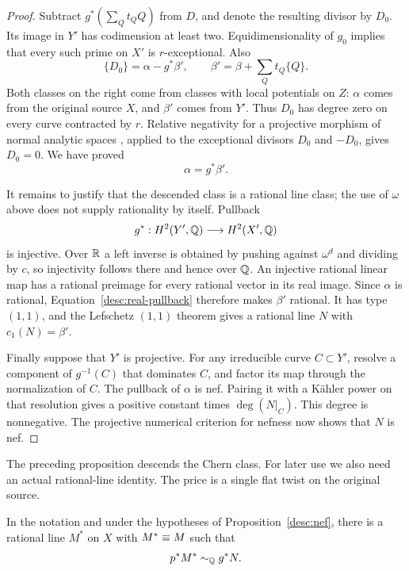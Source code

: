 \begin{proof}
Subtract $g^*(\sum_Q t_QQ)$ from $D$, and denote the resulting divisor
by $D_0$.  Its image in $Y'$ has codimension at least two.
Equidimensionality of $g_0$ implies that every such prime on $X'$ is
$r$-exceptional.  Also
\[
 \{D_0\}=\alpha-g^*\beta',\qquad
 \beta'=\beta+\sum_Q t_Q\{Q\}.
\]
Both classes on the right come from classes with local potentials
on $Z$: $\alpha$ comes from the original source $X$, and $\beta'$
comes from $Y'$.  Thus $D_0$ has degree zero on every curve contracted
by $r$.  Relative negativity for a projective morphism of normal analytic
spaces \cite[Section~11, after Definition~11.1]{FujinoAnalyticBCHM}, applied to the exceptional divisors
$D_0$ and $-D_0$, gives $D_0=0$.  We have proved
\begin{equation}\label{desc:real-pullback}
                              \alpha=g^*\beta'.
\end{equation}

It remains to justify that the descended class is a rational line
class; the use of $\omega$ above does not supply rationality by
itself.  Pullback
\[
                    g^*:H^2(Y',\mathbb Q)\longrightarrow H^2(X',\mathbb Q)
\]
is injective.  Over $\mathbb R$ a left inverse is obtained by pushing
against $\omega^d$ and dividing by $c$, so injectivity follows there
and hence over $\mathbb Q$.  An injective rational linear map has a rational
preimage for every rational vector in its real image.  Since
$\alpha$ is rational, Equation~\eqref{desc:real-pullback} therefore
makes $\beta'$ rational.  It has type $(1,1)$, and the Lefschetz
$(1,1)$ theorem gives a rational line $N$ with $c_1(N)=\beta'$.

Finally suppose that $Y'$ is projective.  For any irreducible curve
$C\subset Y'$, resolve a component of $g^{-1}(C)$ that dominates
$C$, and factor its map through the normalization of $C$.
The pullback of $\alpha$ is nef.  Pairing it with a K\"ahler power
on that resolution gives a positive constant times $\deg(N|_C)$.
This degree is nonnegative.  The projective numerical criterion for
nefness now shows that $N$ is nef.
\end{proof}

The preceding proposition descends the Chern class.  For later use we
also need an actual rational-line identity.  The price is a single
flat twist on the original source.

\begin{corollary}
\label{desc:representative}
In the notation and under the hypotheses of
Proposition~\ref{desc:nef}, there is a rational line $M^*$ on $X$
with $M^*\equiv M$ such that
\[
                          p^*M^*\sim_{\mathbb Q} g^*N.
\]
\end{corollary}

